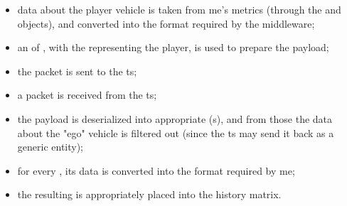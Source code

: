 \begin{itemize}
	\item data about the player vehicle is taken from \gls{me}'s metrics (through the  and  objects), and converted into the format required by the \gls{middleware};
	\item an  of , with the  representing the player, is used to prepare the payload;
	\item the packet is sent to the \gls{ts};
	\item a packet is received from the \gls{ts};
	\item the payload is deserialized into appropriate (s), and from those the data about the "ego" vehicle is filtered out (since the \gls{ts} may send it back as a generic entity);
	\item for every , its data is converted into the format required by \gls{me};
	\item the resulting  is appropriately placed into the history matrix.
\end{itemize}

